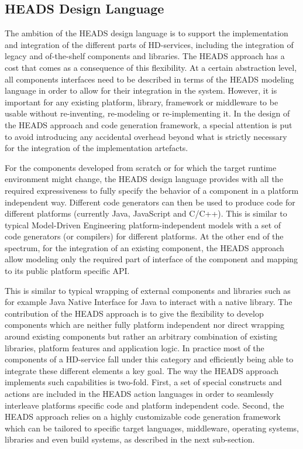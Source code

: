 \subsection{HEADS Design Language}

The ambition of the HEADS design language is to support the implementation and integration of the different parts of HD-services, including the integration of legacy and of-the-shelf components and libraries. The HEADS approach has a cost that comes as a consequence of this flexibility. At a certain abstraction level, all components interfaces need to be described in terms of the HEADS modeling language in order to allow for their integration in the system. However, it is important for any existing platform, library, framework or middleware to be usable without re-inventing, re-modeling or re-implementing it. In the design of the HEADS approach and code generation framework, a special attention is put to avoid introducing any accidental overhead beyond what is strictly necessary for the integration of the implementation artefacts. 

For the components developed from scratch or for which the target runtime environment might change, the HEADS design language provides with all the required expressiveness to fully specify the behavior of a component in a platform independent way. Different code generators can then be used to produce code for different platforms (currently Java, JavaScript and C/C++). This is similar to typical Model-Driven Engineering platform-independent models with a set of code generators (or compilers) for different platforms. At the other end of the spectrum, for the integration of an existing component, the HEADS approach allow modeling only the required part of interface of the component and mapping to its public platform specific API. 

This is similar to typical wrapping of external components and libraries such as for example Java Native Interface for Java to interact with a native library. The contribution of the HEADS approach is to give the flexibility to develop components which are neither fully platform independent nor direct wrapping around existing components but rather an arbitrary combination of existing libraries, platform features and application logic. In practice most of the components of a HD-service fall under this category and efficiently being able to integrate these different elements a key goal. The way the HEADS approach implements such capabilities is two-fold. First, a set of special constructs and actions are included in the HEADS action languages in order to seamlessly interleave platforms specific code and platform independent code. Second, the HEADS approach relies on a highly customizable code generation framework which can be tailored to specific target languages, middleware, operating systems, libraries and even build systems, as described in the next sub-section.

